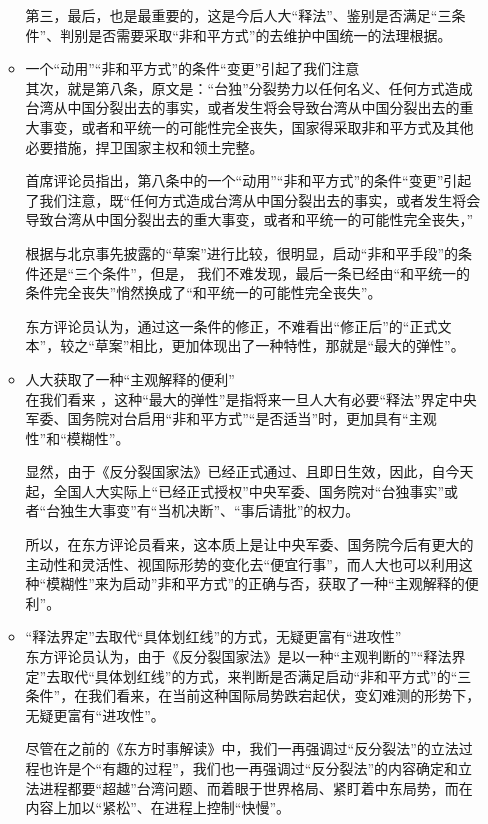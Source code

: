 \documentclass[a4paper,11pt]{article}
\begin{document}
\begin{itemize}
\begin{itemize}
    第三，最后，也是最重要的，这是今后人大“释法”、鉴别是否满足“三条件”、判别是否需要采取“非和平方式”的去维护中国统一的法理根据。
 

\item 一个“动用”“非和平方式”的条件“变更”引起了我们注意\\
\label{sec-2_1_2}%
其次，就是第八条，原文是：“台独”分裂势力以任何名义、任何方式造成台湾从中国分裂出去的事实，或者发生将会导致台湾从中国分裂出去的重大事变，或者和平统一的可能性完全丧失，国家得采取非和平方式及其他必要措施，捍卫国家主权和领土完整。

    首席评论员指出，第八条中的一个“动用”“非和平方式”的条件“变更”引起了我们注意，既“任何方式造成台湾从中国分裂出去的事实，或者发生将会导致台湾从中国分裂出去的重大事变，或者和平统一的可能性完全丧失，”

    根据与北京事先披露的“草案”进行比较，很明显，启动“非和平手段”的条件还是“三个条件”，但是， 我们不难发现，最后一条已经由“和平统一的条件完全丧失”悄然换成了“和平统一的可能性完全丧失”。

    东方评论员认为，通过这一条件的修正，不难看出“修正后”的“正式文本”，较之“草案”相比，更加体现出了一种特性，那就是“最大的弹性”。
 

\item 人大获取了一种“主观解释的便利”\\
\label{sec-2_1_3}%
在我们看来 ，这种“最大的弹性”是指将来一旦人大有必要“释法”界定中央军委、国务院对台启用“非和平方式”“是否适当”时，更加具有“主观性”和“模糊性”。

    显然，由于《反分裂国家法》已经正式通过、且即日生效，因此，自今天起，全国人大实际上“已经正式授权”中央军委、国务院对“台独事实”或者“台独生大事变”有“当机决断”、“事后请批”的权力。

    所以，在东方评论员看来，这本质上是让中央军委、国务院今后有更大的主动性和灵活性、视国际形势的变化去“便宜行事”，而人大也可以利用这种“模糊性”来为启动”非和平方式”的正确与否，获取了一种“主观解释的便利”。
 

\item “释法界定”去取代“具体划红线”的方式，无疑更富有“进攻性”\\
\label{sec-2_1_4}%
东方评论员认为，由于《反分裂国家法》是以一种“主观判断的”“释法界定”去取代“具体划红线”的方式，来判断是否满足启动“非和平方式”的“三条件”，在我们看来，在当前这种国际局势跌宕起伏，变幻难测的形势下，无疑更富有“进攻性”。

    尽管在之前的《东方时事解读》中，我们一再强调过“反分裂法”的立法过程也许是个“有趣的过程”，我们也一再强调过“反分裂法”的内容确定和立法进程都要“超越”台湾问题、而着眼于世界格局、紧盯着中东局势，而在内容上加以“紧松”、在进程上控制“快慢”。


\end{itemize}
\end{itemize}
\end{document}
